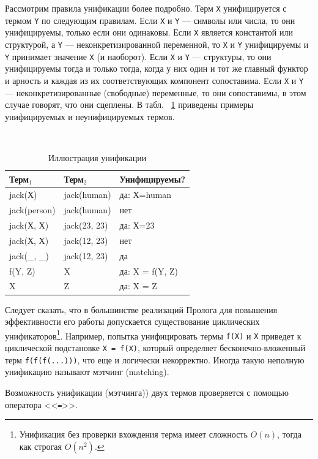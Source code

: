 \documentclass[12pt, openany, twoside]{book} %
\begin{document}
Рассмотрим правила унификации более подробно. Терм {\tt X} унифицируется с термом {\tt Y} по следующим правилам. Если {\tt Х} и {\tt Y} --- символы или числа, то они унифицируемы, только если они одинаковы. Если {\tt Х} является константой или структурой, а {\tt Y} --- неконкретизированной переменной, то {\tt Х} и {\tt Y} унифицируемы и {\tt Y} принимает значение {\tt Х} (и наоборот). Если {\tt Х} и {\tt Y} --- структуры, то они унифицируемы тогда и только тогда, когда у них один и тот же главный функтор и арность и каждая из их соответствующих компонент сопоставима. Если {\tt Х} и {\tt Y} --- неконкретизированные (свободные) переменные, то они сопоставимы, в этом случае говорят, что они сцеплены. В табл.~ \ref{tab:unif} приведены примеры унифицируемых и неунифицируемых термов.

\begin{table}[ht]
\begin{center}\tt
\begin{tabular}{|l|l|l|}
 \hline
 {\rm Терм${}_1$} & {\rm Терм${}_2$}  &  {\rm Унифицируемы?}
 \\\hline\hline
 jack(Х)  &  jack(human) & {\rm да:} Х=human
 \\\hline
 jack(person) & jack(human)  &  {\rm нет}
 \\\hline
 jack(Х, Х) & jack(23, 23)  &  {\rm да:} Х=23
 \\\hline
 jack(Х, Х) & jack(12, 23)  &  {\rm нет}
 \\\hline
 jack(\_, \_) & jack(12, 23)  &  {\rm да}
 \\\hline
 f(Y, Z) & X  &  {\rm да:} X = f(Y, Z)
  \\\hline
 X & Z  &  {\rm да:} X = Z
  \\\hline
\end{tabular}
\end{center}
\caption{Иллюстрация унификации} \label{tab:unif}
\end{table}

Следует сказать, что в большинстве реализаций Пролога для повышения эффективности его работы допускается существование циклических унификаторов\footnote{Унификация без проверки вхождения терма имеет сложность $O(n)$, тогда как строгая $O(n^2)$.}. Например, попытка унифицировать термы {\tt f(X)} и {\tt Х} приведет к циклической подстановке {\tt X = f(X)}, который определяет бесконечно-вложенный терм {\tt f(f(f(...)))}, что еще и логически некорректно. Иногда такую неполную унификацию называют мэтчинг (matching).

Возможность унификации (мэтчинга)) двух термов проверяется с помощью оператора <<{\tt =}>>.
\end{document}
